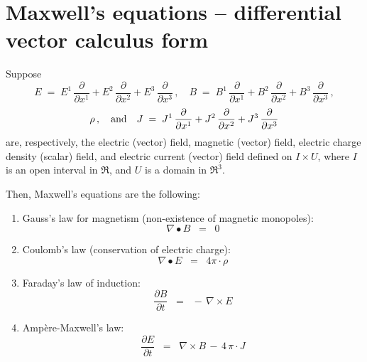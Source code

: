 

\section{Maxwell's equations -- differential vector calculus form}
\setcounter{theorem}{0}
\setcounter{equation}{0}


\renewcommand{\theenumi}{\roman{enumi}}
\renewcommand{\labelenumi}{\textnormal{(\theenumi)}$\;\;$}


Suppose
\begin{equation*}
E \; = \; E^{1}\,\dfrac{\partial}{\partial x^{1}} + E^{2}\,\dfrac{\partial}{\partial x^{2}} + E^{3}\,\dfrac{\partial}{\partial x^{3}}\,,
\quad
B \; = \; B^{1}\,\dfrac{\partial}{\partial x^{1}} + B^{2}\,\dfrac{\partial}{\partial x^{2}} + B^{3}\,\dfrac{\partial}{\partial x^{3}}\,,
\end{equation*}
\begin{equation*}
\rho\,,
\quad\textnormal{and}\quad
J \; = \; J^{1}\,\dfrac{\partial}{\partial x^{1}} + J^{2}\,\dfrac{\partial}{\partial x^{2}} + J^{3}\,\dfrac{\partial}{\partial x^{3}}
\end{equation*}
are, respectively, the electric (vector) field, magnetic (vector) field,
electric charge density (scalar) field, and electric current (vector) field
defined on $I \times U$,
where $I$ is an open interval in $\Re$, and $U$ is a domain in $\Re^{3}$.

\vskip 0.5cm
\noindent
Then, Maxwell's equations are the following:
\begin{enumerate}
\item
	Gauss's law for magnetism (non-existence of magnetic monopoles):
	\begin{equation*}
	\nabla \bullet B \;\; = \;\; 0
	\end{equation*}

\item
	Coulomb's law (conservation of electric charge):
	\begin{equation*}
	\nabla \bullet E \;\; = \;\; 4 \pi \cdot \rho
	\end{equation*}

\item
	Faraday's law of induction:
	\begin{equation*}
	\dfrac{\partial B}{\partial t} \;\; = \;\; -\,\nabla \times E
	\end{equation*}

\item
	Amp\`{e}re-Maxwell's law:
	\begin{equation*}
	\dfrac{\partial E}{\partial t} \;\; = \;\; \nabla \times B \,-\, 4\,\pi\cdot J
	\end{equation*}
\end{enumerate}

